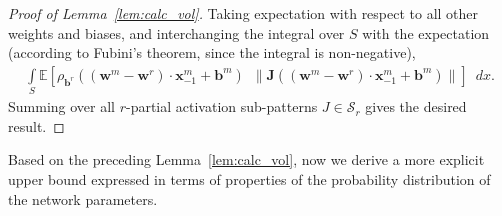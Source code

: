 \documentclass{article}
\theoremstyle{definition}
\begin{document}
\begin{proof}[Proof of Lemma~\ref{lem:calc_vol}]
    Taking expectation with respect to all other weights and biases, and interchanging the integral over $S$ with the expectation (according to Fubini's theorem, since the integral is non-negative), 
    \begin{align*}
        \int\limits_{S} \mathbb{E} \left[ \rho_{\mathbf{b}^r}((\mathbf{w}^m - \mathbf{w}^r) \cdot \mathbf{x}^m_{-1} + \mathbf{b}^m) \enspace \| \mathbf{J} ((\mathbf{w}^m - \mathbf{w}^r) \cdot \mathbf{x}^m_{-1} + \mathbf{b}^m)\| \right] \enspace d x.
    \end{align*}
    Summing over all $r$-partial activation sub-patterns $J\in\mathcal{S}_r$ gives the desired result. 
\end{proof}

Based on the preceding Lemma~\ref{lem:calc_vol}, now we derive a more explicit upper bound expressed in terms of properties of the probability distribution of the network parameters. 
\end{document}
